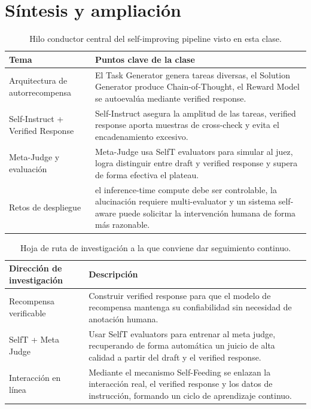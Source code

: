 \documentclass[a4paper]{article}
\begin{document}
\section{Síntesis y ampliación}
\begin{table}[H]
\centering
\begin{tabular}{p{4.5cm}p{11cm}}
\toprule
Tema & Puntos clave de la clase \\
\midrule
Arquitectura de autorrecompensa & El Task Generator genera tareas diversas, el Solution Generator produce Chain-of-Thought, el Reward Model se autoevalúa mediante verified response. \\
Self-Instruct + Verified Response & Self-Instruct asegura la amplitud de las tareas, verified response aporta muestras de cross-check y evita el encadenamiento excesivo. \\
Meta-Judge y evaluación & Meta-Judge usa SelfT evaluators para simular al juez, logra distinguir entre draft y verified response y supera de forma efectiva el plateau. \\
Retos de despliegue & el inference-time compute debe ser controlable, la alucinación requiere multi-evaluator y un sistema self-aware puede solicitar la intervención humana de forma más razonable. \\
\bottomrule
\end{tabular}
\caption{Hilo conductor central del self-improving pipeline visto en esta clase.}
\end{table}

\begin{table}[H]
\centering
\begin{tabular}{p{5cm}p{10cm}}
\toprule
Dirección de investigación & Descripción \\
\midrule
Recompensa verificable & Construir verified response para que el modelo de recompensa mantenga su confiabilidad sin necesidad de anotación humana. \\
SelfT + Meta Judge & Usar SelfT evaluators para entrenar al meta judge, recuperando de forma automática un juicio de alta calidad a partir del draft y el verified response. \\
Interacción en línea & Mediante el mecanismo Self-Feeding se enlazan la interacción real, el verified response y los datos de instrucción, formando un ciclo de aprendizaje continuo. \\
\bottomrule
\end{tabular}
\caption{Hoja de ruta de investigación a la que conviene dar seguimiento continuo.}
\end{table}
\end{document}
